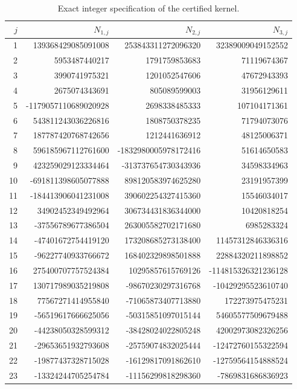 \documentclass[11pt]{article}
\theoremstyle{definition}
\theoremstyle{remark}
\begin{document}
\begin{table}[htbp]
\centering
\small
\setlength{\tabcolsep}{4pt}
\begin{tabular}{r|r r r}
\toprule
$j$ & $N_{1,j}$ & $N_{2,j}$ & $N_{3,j}$\\
\midrule
1 & 139368429085091008 & 253843311272096320 & 32389009049152552 \\
2 & 5953487440217 & 1791759853683 & 71119674367 \\
3 & 3990741975321 & 1201052547606 & 47672943393 \\
4 & 2675074343691 & 805089599003 & 31956129611 \\
5 & -1179057110689020928 & 2698338485333 & 107104171361 \\
6 & 543811243036226816 & 1808750378235 & 71794073076 \\
7 & 187787420768742656 & 1212441636912 & 48125006371 \\
8 & 596185967112761600 & -1832980005978172416 & 51614650583 \\
9 & 423259029123334464 & -313737654730343936 & 34598334963 \\
10 & -691811398605077888 & 898120583974625280 & 23191957399 \\
11 & -184413906041231008 & 390602254327415360 & 15546034017 \\
12 & 34902452349492964 & 306734431836344000 & 10420818254 \\
13 & -37556789677386504 & 263005582702171680 & 6985283324 \\
14 & -47401672754419120 & 173208685273138400 & 11457312846336316 \\
15 & -96227740933766672 & 168402329898501888 & 22884320211898852 \\
16 & 275400707757524384 & 10295857615769126 & -114815326321236128 \\
17 & 130717989035219808 & -98670230297316768 & -10429295523610740 \\
18 & 77567271414955840 & -71065873407713880 & 172273975475231 \\
19 & -56519617666625056 & -50315851097015144 & 54605577509679488 \\
20 & -44238050328599312 & -38428024022805248 & 42002973082326256 \\
21 & -29653651932793608 & -25759074832025444 & -12472760155322594 \\
22 & -19877437328715028 & -16129817091862610 & -12759564154888524 \\
23 & -13324244705254784 & -11156299818298360 & -7869831686836923 \\
\bottomrule
\end{tabular}
\caption{Exact integer specification of the certified kernel.}
\label{tab:cert-kernel}
\end{table}
\end{document}
